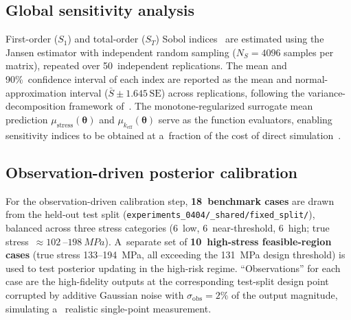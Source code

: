 \documentclass[pdflatex,sn-mathphys-num]{sn-jnl}
\theoremstyle{thmstyleone}
\theoremstyle{thmstyletwo}
\theoremstyle{thmstylethree}
\begin{document}
\subsection{Global sensitivity analysis}\label{sec:sobol}


First-order ($S_1$) and total-order ($S_T$) Sobol indices~\cite{ref:sobol,ref:saltelli}
are estimated using the Jansen estimator with independent random sampling
($N_S = \num{4096}$ samples per matrix), repeated over 50~independent replications.
The mean and 90\%~confidence interval of each index are reported as the mean and
normal-approximation interval ($\bar{S} \pm 1.645\,\mathrm{SE}$) across replications,
following the variance-decomposition framework of~\cite{ref:saltelli}.
The monotone-regularized surrogate mean prediction $\mu_{\mathrm{stress}}(\bm{\theta})$ and
$\mu_{k_{\mathrm{eff}}}(\bm{\theta})$ serve as the function evaluators, enabling
sensitivity indices to be obtained at a~fraction of the cost of direct simulation~\cite{ref:zhang2025energy}.

\subsection{Observation-driven posterior calibration}\label{sec:inverse}


For the observation-driven calibration step, \textbf{18~benchmark cases} are drawn
from the held-out test split (\texttt{experiments\_0404/\_shared/fixed\_split/}),
balanced across three stress categories (6~low, 6~near-threshold, 6~high;
true stress~$\approx\SI{102}{}$--$\SI{198}{MPa}$).
A~separate set of \textbf{10~high-stress feasible-region cases}
(true stress 133--\SI{194}{MPa}, all exceeding the \SI{131}{MPa} design
threshold) is used to test posterior updating in the high-risk regime.
``Observations'' for each case are the high-fidelity outputs at the
corresponding test-split design point corrupted by additive Gaussian noise
with $\sigma_{\mathrm{obs}}=2\%$ of the output magnitude, simulating a~
realistic single-point measurement.
\end{document}
